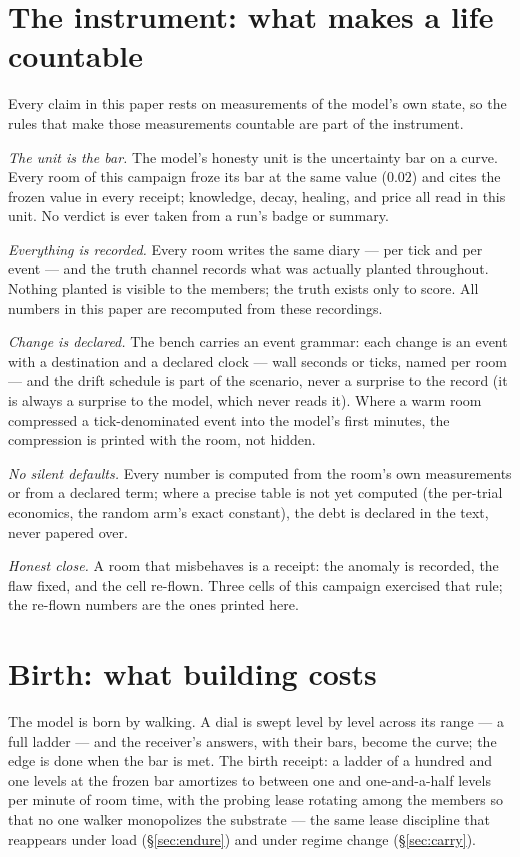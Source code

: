 \documentclass[11pt,a4paper]{article}
\begin{document}
\section{The instrument: what makes a life countable}
\label{sec:instrument}

Every claim in this paper rests on measurements of the model's own
state, so the rules that make those measurements countable are part
of the instrument.

\emph{The unit is the bar.} The model's honesty unit is the
uncertainty bar on a curve. Every room of this campaign froze its bar
at the same value ($0.02$) and cites the frozen value in every
receipt; knowledge, decay, healing, and price all read in this unit.
No verdict is ever taken from a run's badge or summary.

\emph{Everything is recorded.} Every room writes the same diary ---
per tick and per event --- and the truth channel records what was
actually planted throughout. Nothing planted is visible to the
members; the truth exists only to score. All numbers in this paper
are recomputed from these recordings.

\emph{Change is declared.} The bench carries an event grammar: each
change is an event with a destination and a declared clock --- wall
seconds or ticks, named per room --- and the drift schedule is part
of the scenario, never a surprise to the record (it is always a
surprise to the model, which never reads it). Where a warm room
compressed a tick-denominated event into the model's first minutes,
the compression is printed with the room, not hidden.

\emph{No silent defaults.} Every number is computed from the room's
own measurements or from a declared term; where a precise table is
not yet computed (the per-trial economics, the random arm's exact
constant), the debt is declared in the text, never papered over.

\emph{Honest close.} A room that misbehaves is a receipt: the
anomaly is recorded, the flaw fixed, and the cell re-flown. Three
cells of this campaign exercised that rule; the re-flown numbers are
the ones printed here.

\section{Birth: what building costs}
\label{sec:birth}

The model is born by walking. A dial is swept level by level across
its range --- a full ladder --- and the receiver's answers, with their
bars, become the curve; the edge is done when the bar is met. The
birth receipt: a ladder of a hundred and one levels at the frozen bar
amortizes to between one and one-and-a-half levels per minute of room
time, with the probing lease rotating among the members so that no
one walker monopolizes the substrate --- the same lease discipline
that reappears under load (\S\ref{sec:endure}) and under regime
change (\S\ref{sec:carry}).
\end{document}
